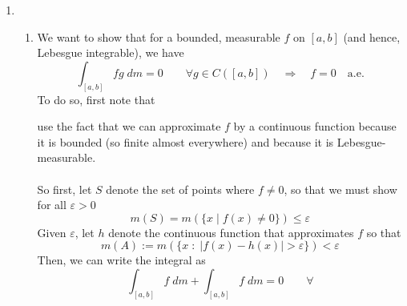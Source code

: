 \documentclass[12pt]{article}
\theoremstyle{plain}
\theoremstyle{definition}
\theoremstyle{remark}
\begin{document}
\begin{enumerate}
\item  
\begin{enumerate} 

\item We want to show that for a bounded, measurable $f$ on $[a,b]$ (and hence, Lebesgue integrable), we have  
\[
    \int_{[a,b]} fg \; dm = 0 \qquad \forall 
    g\in C([a,b]) 
    \quad \Rightarrow \quad
    f=0 \quad \text{a.e.}
\]
To do so, first note that  

use the fact that we can approximate $f$ by a continuous function because it is bounded (so finite almost everywhere) and because it is Lebesgue-measurable.
\\
\\
So first, let $S$ denote the set of points where $f\neq 0$, so that we must show for all $\varepsilon>0$
\[
    m(S) = m(\{x \; | \; f(x) \neq 0 \}) \leq \varepsilon
\]
Given $\varepsilon$, let $h$ denote the continuous function that approximates $f$ so that 
\[
    m(A):=
    m(\{x \; : \; |f(x)-h(x)|>\varepsilon\}) <\varepsilon
\]
Then, we can write the integral as
\[
    \int_{[a,b]} f \; dm + 
    \int_{[a,b]} f \; dm = 0 \qquad \forall 
\]


\end{enumerate}
\end{enumerate}
\end{document}
